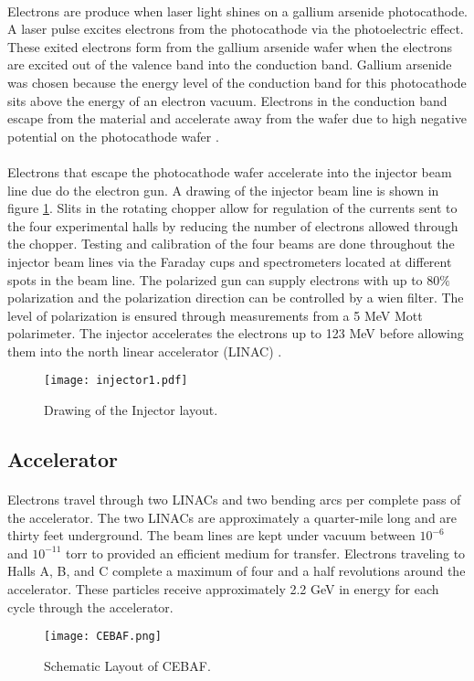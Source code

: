 	\paragraph{}Electrons are produce when laser light shines on a gallium arsenide photocathode. A laser pulse excites electrons from the photocathode via the photoelectric effect. These exited electrons form from the gallium arsenide wafer when the electrons are excited out of the valence band into the conduction band. Gallium arsenide was chosen because the energy level of the conduction band for this photocathode sits above the energy of an electron vacuum. Electrons in the conduction band escape from the material and accelerate away from the wafer due to high negative potential on the photocathode wafer \cite{sane}. 
	\paragraph{}Electrons that escape the photocathode wafer accelerate into the injector beam line due do the electron gun. A drawing of the injector beam line is shown in figure \ref{fig:inj}. Slits in the rotating chopper allow for regulation of the currents sent to the four experimental halls by reducing the number of electrons allowed through the chopper. Testing and calibration of the four beams are done throughout the injector beam lines via the Faraday cups and spectrometers located at different spots in the beam line. The polarized gun can supply electrons with up to 80$\%$ polarization and the polarization direction can be controlled by a wien filter. The level of polarization is ensured through measurements from a 5 MeV Mott polarimeter\cite{HallA}. The injector accelerates the electrons up to 123 MeV before allowing them into the north linear accelerator (LINAC) \cite{ref:4beams,CEBAF,ref:photogun}.
		\begin{figure}[t]
		\centering
		\texttt{[image: injector1.pdf]} 
		\caption{Drawing of the Injector layout. }
		\label{fig:inj}
	\end{figure} 
	
	
\subsection{Accelerator}
	\paragraph{} Electrons travel through two LINACs and two bending arcs per complete pass of the accelerator. The two LINACs are approximately a quarter-mile long and are thirty feet underground. The beam lines are kept under vacuum between $10^{-6}$ and $10^{-11}$ torr to provided an efficient medium for transfer.  Electrons traveling to Halls A, B, and C complete a maximum of four and a half revolutions around the accelerator. These particles receive approximately 2.2 GeV in energy for each cycle through the accelerator. 
	\begin{figure}[t]
		\centering
		\texttt{[image: CEBAF.png]} 
				\caption{Schematic Layout of CEBAF. }
		\label{CEBAF}
   \end{figure} 

